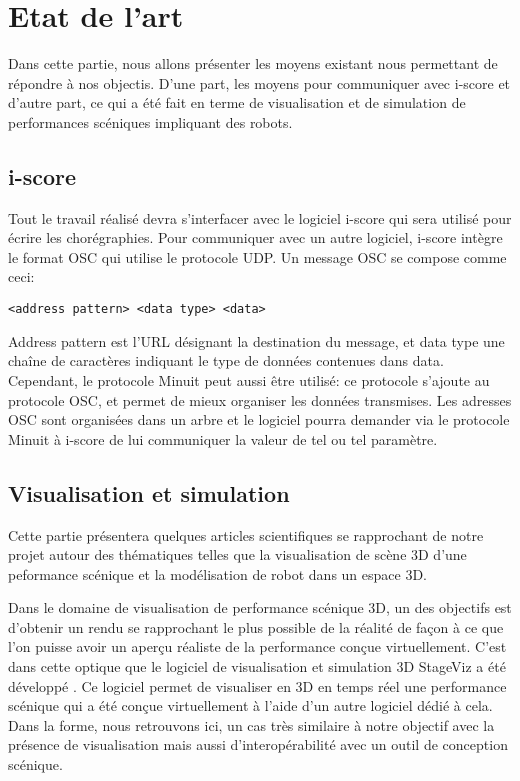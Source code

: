 \section{Etat de l'art}

Dans cette partie, nous allons présenter les moyens existant nous permettant de répondre à nos objectis. D'une part, les moyens pour communiquer avec i-score et d'autre part, ce qui a été fait en terme de visualisation et de simulation de performances scéniques impliquant des robots.

\subsection{i-score}

Tout le travail réalisé devra s'interfacer avec le logiciel i-score qui sera utilisé pour écrire les chorégraphies. Pour communiquer avec un autre logiciel, i-score intègre le format OSC qui utilise le protocole UDP. Un message OSC se compose comme ceci:
\begin{lstlisting}
<address pattern> <data type> <data>
\end{lstlisting}
Address pattern est l'URL désignant la destination du message, et data type une chaîne de caractères indiquant le type de données contenues dans data.
Cependant, le protocole Minuit peut aussi être utilisé: ce protocole s'ajoute au protocole OSC, et permet de mieux organiser les données transmises. Les adresses OSC sont organisées dans un arbre et le logiciel pourra demander via le protocole Minuit à i-score de lui communiquer la valeur de tel ou tel paramètre.  


\subsection{Visualisation et simulation}

Cette partie présentera quelques articles scientifiques se rapprochant de notre projet autour des thématiques telles que la visualisation de scène 3D d'une peformance scénique et la modélisation de robot dans un espace 3D. 

Dans le domaine de visualisation de performance scénique 3D, un des objectifs est d'obtenir un rendu se rapprochant le plus possible de la réalité de façon à ce que l'on puisse avoir un aperçu réaliste de la performance conçue virtuellement. C'est dans cette optique que le logiciel de visualisation et simulation 3D StageViz\cite{StageViz} a été développé . Ce logiciel permet de visualiser en 3D en temps réel une performance scénique qui a été conçue virtuellement à l'aide d'un autre logiciel dédié à cela. Dans la forme, nous retrouvons ici, un cas très similaire à notre objectif avec la présence de visualisation mais aussi d'interopérabilité avec un outil de conception scénique.

